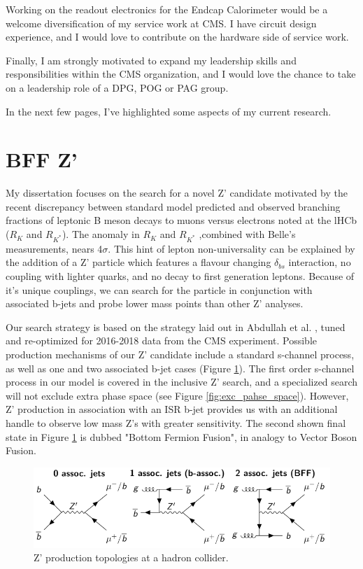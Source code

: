\documentclass[11pt]{article}
\begin{document}
Working on the readout electronics for the Endcap Calorimeter would be a welcome diversification of my service work at CMS. I have circuit design experience, and I would love to contribute on the hardware side of service work.

Finally, I am strongly motivated to expand my leadership skills and responsibilities within the CMS organization, and I would love the chance to take on a leadership role of a DPG, POG or PAG group.

In the next few pages, I've highlighted some aspects of my current research. 

\section{BFF Z'}

My dissertation focuses on the search for a novel Z' candidate motivated by the recent discrepancy between standard model predicted and observed branching fractions of leptonic B meson decays to muons versus electrons noted at the lHCb ($R_K$ and $R_{K^{*}}$). The anomaly in $R_K$ and $R_{K^{*}}$ ,combined with Belle's measurements, nears 4$\sigma$\cite{rkStar}. This hint of lepton non-universality can be explained by the addition of a Z' particle which features a flavour changing $\delta_{bs}$ interaction, no coupling with lighter quarks, and no decay to first generation leptons. Because of it's unique couplings, we can search for the particle in conjunction with associated b-jets and probe lower mass points than other Z' analyses. 

Our search strategy is based on the strategy laid out in Abdullah et al. \cite{PhysRevD.97.075035}, tuned and re-optimized for 2016-2018 data from the CMS experiment. Possible production mechanisms of our Z' candidate include a standard s-channel process, as well as one and two associated b-jet cases (Figure \ref{fig:z_prime_cases}). The first order s-channel process in our model is covered in the inclusive Z' search, and a specialized search will not exclude extra phase space (see Figure \ref{fig:exc_pahse_space}). However, Z' production in association with an ISR b-jet provides us with an additional handle to observe low mass Z's with greater sensitivity. The second shown final state in Figure \ref{fig:z_prime_cases} is dubbed "Bottom Fermion Fusion", in analogy to Vector Boson Fusion. 


\begin{figure}[h]
    \centering
    \includegraphics[width=\textwidth]{images/BFF_z_prime_cases.png}
    \caption{Z' production topologies at a hadron collider.}
    \label{fig:z_prime_cases}
\end{figure}
\end{document}

